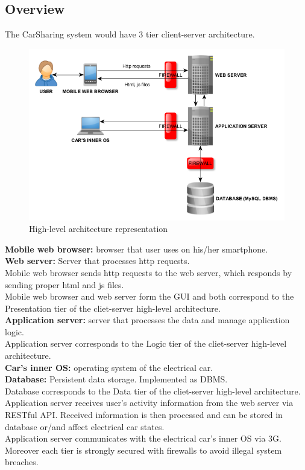 \documentclass[12pt, letterpaper]{article}
\begin{document}
\subsection{Overview}

The CarSharing system would have 3 tier client-server architecture. 

\begin{figure}[H]
\centering
\includegraphics[width=\textwidth]{hlarch.png}
\caption{High-level architecture representation}
\label{fig:hlarch}
\end{figure}

\textbf{Mobile web browser:} browser that user uses on his/her smartphone. \\ 
\textbf{Web server:} Server that processes http requests. \\
Mobile web browser sends http requests to the web server, which responds by sending proper html and js files. \\
Mobile web browser and web server form the GUI and both correspond to the Presentation tier of the cliet-server high-level architecture. \\
\vspace{0.5cm}
\textbf{Application server:} server that processes the data and manage application logic. \\ 
Application server corresponds to the Logic tier of the cliet-server high-level architecture. \\
\vspace{0.5cm}
\textbf{Car's inner OS:} operating system of the electrical car. \\ 
\textbf{Database:} Persistent data storage. Implemented as DBMS. \\
Database corresponds to the Data tier of the cliet-server high-level architecture. \\
\vspace{0.5cm}
Application server receives user's activity information from the web server via RESTful API. Received information is then processed and can be stored in database or/and affect electrical car states. \\
Application server communicates with the electrical car's inner OS via 3G.\\
\vspace{0.5cm}
Moreover each tier is strongly secured with firewalls to avoid illegal system breaches.
\end{document}
